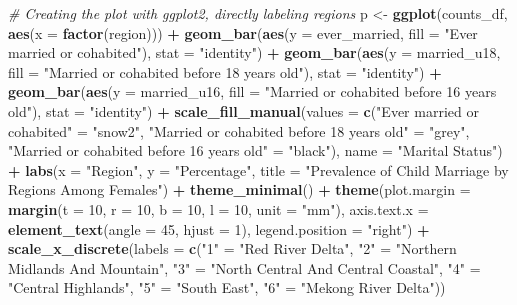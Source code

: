 \documentclass[
]{article}
\newenvironment{Shaded}{\begin{snugshade}}{\end{snugshade}}
\newcommand{\AttributeTok}[1]{\textcolor[rgb]{0.13,0.29,0.53}{#1}}
\newcommand{\CommentTok}[1]{\textcolor[rgb]{0.56,0.35,0.01}{\textit{#1}}}
\newcommand{\DecValTok}[1]{\textcolor[rgb]{0.00,0.00,0.81}{#1}}
\newcommand{\FunctionTok}[1]{\textcolor[rgb]{0.13,0.29,0.53}{\textbf{#1}}}
\newcommand{\NormalTok}[1]{#1}
\newcommand{\OtherTok}[1]{\textcolor[rgb]{0.56,0.35,0.01}{#1}}
\newcommand{\SpecialCharTok}[1]{\textcolor[rgb]{0.81,0.36,0.00}{\textbf{#1}}}
\newcommand{\StringTok}[1]{\textcolor[rgb]{0.31,0.60,0.02}{#1}}
\begin{document}
\begin{Shaded}
\begin{Highlighting}[]
\CommentTok{\# Creating the plot with ggplot2, directly labeling regions}
\NormalTok{p }\OtherTok{\textless{}{-}} \FunctionTok{ggplot}\NormalTok{(counts\_df, }\FunctionTok{aes}\NormalTok{(}\AttributeTok{x =} \FunctionTok{factor}\NormalTok{(region))) }\SpecialCharTok{+}
  \FunctionTok{geom\_bar}\NormalTok{(}\FunctionTok{aes}\NormalTok{(}\AttributeTok{y =}\NormalTok{ ever\_married, }\AttributeTok{fill =} \StringTok{"Ever married or cohabited"}\NormalTok{), }\AttributeTok{stat =} \StringTok{"identity"}\NormalTok{) }\SpecialCharTok{+}
  \FunctionTok{geom\_bar}\NormalTok{(}\FunctionTok{aes}\NormalTok{(}\AttributeTok{y =}\NormalTok{ married\_u18, }\AttributeTok{fill =} \StringTok{"Married or cohabited before 18 years old"}\NormalTok{), }\AttributeTok{stat =} \StringTok{"identity"}\NormalTok{) }\SpecialCharTok{+}
  \FunctionTok{geom\_bar}\NormalTok{(}\FunctionTok{aes}\NormalTok{(}\AttributeTok{y =}\NormalTok{ married\_u16, }\AttributeTok{fill =} \StringTok{"Married or cohabited before 16 years old"}\NormalTok{), }\AttributeTok{stat =} \StringTok{"identity"}\NormalTok{) }\SpecialCharTok{+}
  \FunctionTok{scale\_fill\_manual}\NormalTok{(}\AttributeTok{values =} \FunctionTok{c}\NormalTok{(}\StringTok{"Ever married or cohabited"} \OtherTok{=} \StringTok{"snow2"}\NormalTok{, }
                               \StringTok{"Married or cohabited before 18 years old"} \OtherTok{=} \StringTok{"grey"}\NormalTok{, }
                               \StringTok{"Married or cohabited before 16 years old"} \OtherTok{=} \StringTok{"black"}\NormalTok{),}
                    \AttributeTok{name =} \StringTok{"Marital Status"}\NormalTok{) }\SpecialCharTok{+}
  \FunctionTok{labs}\NormalTok{(}\AttributeTok{x =} \StringTok{"Region"}\NormalTok{, }\AttributeTok{y =} \StringTok{"Percentage"}\NormalTok{, }\AttributeTok{title =} \StringTok{"Prevalence of Child Marriage by Regions Among Females"}\NormalTok{) }\SpecialCharTok{+}
  \FunctionTok{theme\_minimal}\NormalTok{() }\SpecialCharTok{+}
  \FunctionTok{theme}\NormalTok{(}\AttributeTok{plot.margin =} \FunctionTok{margin}\NormalTok{(}\AttributeTok{t =} \DecValTok{10}\NormalTok{, }\AttributeTok{r =} \DecValTok{10}\NormalTok{, }\AttributeTok{b =} \DecValTok{10}\NormalTok{, }\AttributeTok{l =} \DecValTok{10}\NormalTok{, }\AttributeTok{unit =} \StringTok{"mm"}\NormalTok{), }
        \AttributeTok{axis.text.x =} \FunctionTok{element\_text}\NormalTok{(}\AttributeTok{angle =} \DecValTok{45}\NormalTok{, }\AttributeTok{hjust =} \DecValTok{1}\NormalTok{), }
        \AttributeTok{legend.position =} \StringTok{"right"}\NormalTok{) }\SpecialCharTok{+}
  \FunctionTok{scale\_x\_discrete}\NormalTok{(}\AttributeTok{labels =} \FunctionTok{c}\NormalTok{(}\StringTok{"1"} \OtherTok{=} \StringTok{"Red River Delta"}\NormalTok{, }\StringTok{"2"} \OtherTok{=} \StringTok{"Northern Midlands And Mountain"}\NormalTok{, }
                              \StringTok{"3"} \OtherTok{=} \StringTok{"North Central And Central Coastal"}\NormalTok{, }\StringTok{"4"} \OtherTok{=} \StringTok{"Central Highlands"}\NormalTok{, }
                              \StringTok{"5"} \OtherTok{=} \StringTok{"South East"}\NormalTok{, }\StringTok{"6"} \OtherTok{=} \StringTok{"Mekong River Delta"}\NormalTok{))}


\end{Highlighting}
\end{Shaded}
\end{document}
